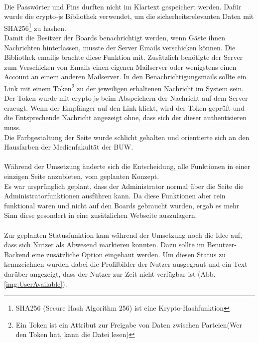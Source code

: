 \\
Die Passwörter und Pins durften nicht im Klartext gespeichert werden.
Dafür wurde die crypto-js\cite{cryptojs:website} Bibliothek verwendet, um die sicherheitsrelevanten Daten mit SHA256\footnote{SHA256 (Secure Hash Algorithm 256) ist eine Krypto-Hashfunktion} zu hashen.
\\
Damit die Besitzer der Boards benachrichtigt werden, wenn Gäste ihnen Nachrichten hinterlassen, musste der Server Emails verschicken können.
Die Bibliothek emailjs\cite{emailjs:website} brachte diese Funktion mit. Zusätzlich benötigte der Server zum Verschicken von Emails einen eigenen Mailserver oder wenigstens einen Account an einem anderen Mailserver.
In den Benachrichtigungsmails sollte ein Link mit einem Token\footnote{Ein Token ist ein Attribut zur Freigabe von Daten zwischen Parteien(Wer den Token hat, kann die Datei lesen)} zu der jeweiligen erhaltenen Nachricht im System sein. Der Token wurde mit crypto-js beim Abspeichern der Nachricht auf dem Server erzeugt. Wenn der Empfänger auf den Link klickt, wird der Token geprüft und die Entsprechende Nachricht angezeigt ohne, dass sich der dieser authentisieren muss.
\\
Die Farbgestaltung der Seite wurde schlicht gehalten und orientierte sich an den Hausfarben der Medienfakultät der BUW.
\\
\\
Während der Umsetzung änderte sich die Entscheidung, alle Funktionen in einer einzigen Seite anzubieten, vom geplanten Konzept.
\\
Es war ursprünglich geplant, dass der Administrator normal über die Seite die Administratorfunktionen ausführen kann. Da diese Funktionen aber rein funktional waren und nicht auf den Boards gebraucht wurden, ergab es mehr Sinn diese gesondert in eine zusätzlichen Webseite auszulagern.
\\
\\
Zur geplanten Statusfunktion kam während der Umsetzung noch die Idee auf, dass sich Nutzer als Abwesend markieren konnten. Dazu sollte im Benutzer-Backend eine zusätzliche Option eingebaut werden. Um diesen Status zu kennzeichnen wurden dabei die Profilbilder der Nutzer ausgegraut und ein Text darüber angezeigt, dass der Nutzer zur Zeit nicht verfügbar ist (Abb. \ref{img:UserAvailable}).
